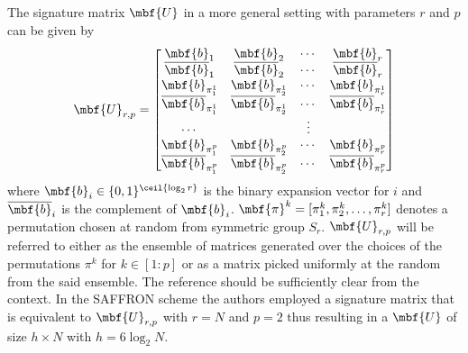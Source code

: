 \documentclass[conference,,twocolumn]{IEEEtran}
\begin{document}
 
 The signature matrix 	$\mbf{U}$ in a more general setting with parameters $r$ and $p$ can be given by
 \begin{align}
\label{Eqn:SignatureMatrix}
\mbf{U}_{r,p}=\begin{bmatrix}
\mbf{b}_1  & \mbf{b}_2 &\cdots & \mbf{b}_r \\
\overline{\mbf{b}}_1 & \overline{\mbf{b}}_2 & \cdots & \overline{\mbf{b}}_r\\
\mbf{b}_{\pi^{1}_{1}} & \mbf{b}_{\pi^{1}_{2}} & \cdots & \mbf{b}_{\pi^{1}_{r}}\\
\overline{\mbf{b}}_{\pi^{1}_{1}} & \overline{\mbf{b}}_{\pi^{1}_{2}} & \cdots & \overline{\mbf{b}}_{\pi^{1}_{r}}\\
\cdots &  &\vdots \\
\mbf{b}_{\pi^{p}_{1}} & \mbf{b}_{\pi^{p}_{2}} & \cdots & \mbf{b}_{\pi^{p}_{r}}\\
\overline{\mbf{b}}_{\pi^{p}_{1}} & \overline{\mbf{b}}_{\pi^{p}_{2}} & \cdots & \overline{\mbf{b}}_{\pi^{p}_{r}}
\end{bmatrix}
\end{align}  
where $\mbf{b}_{i}\in\{0,1\}^{\ceil{\log_{2}r}}$ is the binary expansion vector for $i$ and $\overline{\mbf{b}}_{i}$ is the complement of $\mbf{b}_{i}$. $\mbf{\pi}^{k}=[\pi^{k}_1,\pi^{k}_2,\ldots,\pi^{k}_r]$ denotes a permutation chosen at random from symmetric group $S_{r}$.  $\mbf{U}_{r,p}$ will be referred to either as the ensemble of matrices generated over the choices of the permutations $\pi^{k}$ for $k\in[1:p]$ or as a matrix picked uniformly at the random from the said ensemble. The reference should be sufficiently clear from the context. In the SAFFRON scheme the authors employed a signature matrix that is equivalent to $\mbf{U}_{r,p}$ with $r=N$ and $p=2$ thus resulting in a $\mbf{U}$ of size $h \times N$ with $h=6\log_{2}N$. 
\end{document}
